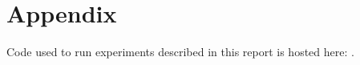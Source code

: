 \documentclass[10pt]{article}
\begin{document}


\section{Appendix} \label{appendix}
Code used to run experiments described in this report is hosted here: . 

%
%
\end{document}
